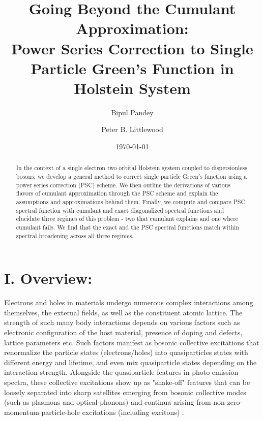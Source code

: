 \documentclass[%
 reprint,
 amsmath,amssymb,
 aps,prl,
floatfix
]{revtex4-2}
\begin{document}
\title{Going Beyond the Cumulant Approximation:\\Power Series Correction to Single Particle Green's Function in Holstein System }
\author{Bipul Pandey}
\author{Peter B. Littlewood}

\date{\today}%

\begin{abstract}
In the context of a single electron two orbital Holstein system coupled to dispersionless bosons, we develop a general method to correct single particle Green’s function using a power series correction (PSC) scheme. We then outline the derivations of various flavors of cumulant approximation through the PSC scheme and explain the assumptions and approximations behind them. Finally, we compute and compare PSC spectral function with cumulant and exact diagonalized spectral functions and elucidate three regimes of this problem - two that cumulant explains and one where cumulant fails. We find that the exact and the PSC spectral functions match within spectral broadening across all three regimes.
\end{abstract}

\maketitle


\section{I. Overview:\protect}
Electrons and holes in materials undergo numerous complex interactions among themselves, the external fields, as well as the constituent atomic lattice. The strength of such many body interactions depends on various factors such as electronic configuration of the host material, presence of doping and defects, lattice parameters etc. Such factors manifest as bosonic collective excitations that renormalize the particle states (electrons/holes) into quasiparticles states with different energy and lifetime, and even mix quasiparticle states depending on the interaction strength. Alongside the quasiparticle features in photo-emission spectra, these collective excitations show up as "shake-off" features that can be loosely separated into sharp satellites emerging from bosonic collective modes (such as plasmons and optical phonons) and continua arising from non-zero-momentum particle-hole excitations (including excitons) \cite{goulielmakis_real-time_2010,lemell_real-time_2015,neppl_direct_2015}.
\end{document}
